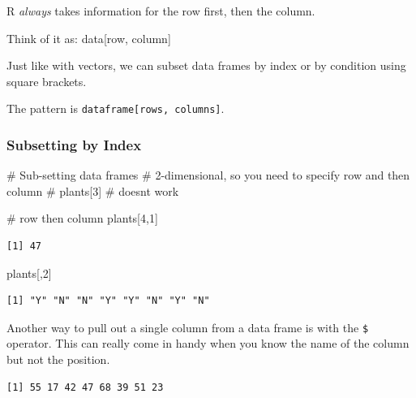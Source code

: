 \documentclass[
  letterpaper,
  DIV=11,
  numbers=noendperiod]{scrartcl}
\newenvironment{Shaded}{\begin{snugshade}}{\end{snugshade}}
\newcommand{\CommentTok}[1]{\textcolor[rgb]{0.37,0.37,0.37}{#1}}
\newcommand{\DecValTok}[1]{\textcolor[rgb]{0.68,0.00,0.00}{#1}}
\newcommand{\NormalTok}[1]{\textcolor[rgb]{0.00,0.23,0.31}{#1}}
\newcommand{\SpecialCharTok}[1]{\textcolor[rgb]{0.37,0.37,0.37}{#1}}
\begin{document}
R \emph{always} takes information for the row first, then the column.

Think of it as: data{[}row, column{]}

Just like with vectors, we can subset data frames by index or by
condition using square brackets.

The pattern is \texttt{dataframe{[}rows,\ columns{]}}.

\subsubsection{Subsetting by Index}\label{subsetting-by-index-1}

\begin{Shaded}
\begin{Highlighting}[]
\CommentTok{\# Sub{-}setting data frames}
\CommentTok{\# 2{-}dimensional, so you need to specify row and then column}
\CommentTok{\# plants[3] \# doesn\textquotesingle{}t work}

\CommentTok{\# row then column}
\NormalTok{plants[}\DecValTok{4}\NormalTok{,}\DecValTok{1}\NormalTok{]}
\end{Highlighting}
\end{Shaded}

\begin{verbatim}
[1] 47
\end{verbatim}

\begin{Shaded}
\begin{Highlighting}[]
\NormalTok{plants[,}\DecValTok{2}\NormalTok{]}
\end{Highlighting}
\end{Shaded}

\begin{verbatim}
[1] "Y" "N" "N" "Y" "Y" "N" "Y" "N"
\end{verbatim}

Another way to pull out a single column from a data frame is with the
\texttt{\$} operator. This can really come in handy when you know the
name of the column but not the position.

\begin{Shaded}
\end{Shaded}

\begin{verbatim}
[1] 55 17 42 47 68 39 51 23
\end{verbatim}
\end{document}
